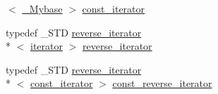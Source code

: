 \begin{DoxyCompactItemize}
$<$ \hyperlink{classvector_a1d0fa35df9c0b874ea870eae971fe5e0}{\+\_\+\+Mybase} $>$ \hyperlink{classvector_abed2910558c61a5a17113b2d250994da}{const\+\_\+iterator}
\item 
typedef \+\_\+\+S\+T\+D \hyperlink{classvector_a40def3e50f68e742f5b0cc571eaf51eb}{reverse\+\_\+iterator}\\*
$<$ \hyperlink{classvector_a5a7a542bca0f55f43e161bd5a09c483d}{iterator} $>$ \hyperlink{classvector_a40def3e50f68e742f5b0cc571eaf51eb}{reverse\+\_\+iterator}
\item 
typedef \+\_\+\+S\+T\+D \hyperlink{classvector_a40def3e50f68e742f5b0cc571eaf51eb}{reverse\+\_\+iterator}\\*
$<$ \hyperlink{classvector_abed2910558c61a5a17113b2d250994da}{const\+\_\+iterator} $>$ \hyperlink{classvector_aefbb12258ea747e127ef628e91e3c061}{const\+\_\+reverse\+\_\+iterator}
\end{DoxyCompactItemize}

